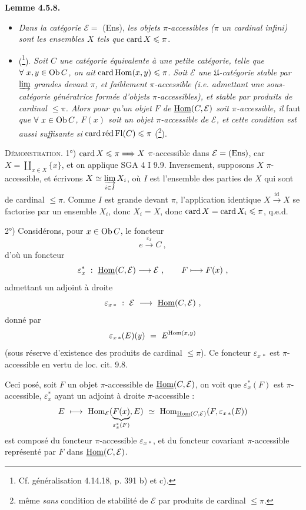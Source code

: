 \textbf{Lemme 4.5.8.}
\begin{itemize}[leftmargin=3em]
\item[\textit{1°)}] \textit{Dans la catégorie $\mathcal{E} = $} (Ens), \textit{les objets $\pi$-accessibles ($\pi$ un cardinal infini) sont les ensembles $X$ tels que} $\operatorname{card} X \leqslant \pi$.
\item[\textit{2°)}] (\footnote{Cf. généralisation 4.14.18, p. 391 b) et c).}). \textit{Soit $C$ une catégorie équivalente à une petite catégorie, telle que $\forall \ x, y \in \mathrm{Ob}\, C$, on ait} $\operatorname{card} \mathrm{Hom}(x,y) \leqslant \pi$. \textit{Soit $\mathcal{E}$ une $\mathfrak{U}$-catégorie stable par $\varinjlim$ grandes devant $\pi$, et faiblement $\pi$-accessible (i.e. admettant une sous-catégorie génératrice formée d'objets $\pi$-accessibles), et stable par produits de cardinal $\leqslant \pi$. Alors pour qu'un objet $F$ de $\underline{\mathrm{Hom}}(C,\mathcal{E})$ soit $\pi$-accessible, il} faut \textit{que $\forall \ x \in \mathrm{Ob}\, C$, $F(x)$ soit un objet $\pi$-accessible de $\mathcal{E}$, et cette condition est aussi suffisante si} $\operatorname{card} \operatorname{\text{réd}} \operatorname{Fl}(C) \leqslant \pi$ (\footnote{même \textit{sans} condition de stabilité de $\mathcal{E}$ par produits de cardinal $\leqslant \pi$.}).
\end{itemize}

\textsc{Démonstration.} 1°) $\operatorname{card} X \leqslant \pi \Longrightarrow X$ $\pi$-accessible dans $\mathcal{E} = (\mathrm{Ens})$, car $X = \coprod_{x \in X} \{x\}$, et on applique SGA 4 I 9.9. Inversement, supposons $X$ $\pi$-accessible, et écrivons $X \simeq \varinjlim\limits_{i \in I} X_i$, où $I$ est l'ensemble des parties de $X$ qui sont de cardinal $\leqslant \pi$. Comme $I$ est grande devant $\pi$, l'application identique $X \xrightarrow{\ \mathrm{id}\ } X$ se factorise par un ensemble $X_i$, donc $X_i = X$, donc $\operatorname{card} X = \operatorname{card} X_i \leqslant \pi$, q.e.d.


2°) Considérons, pour $x \in \mathrm{Ob}\, C$, le foncteur
\[
e \xrightarrow{\ \varepsilon_x\ } C \ ,
\]
d'où un foncteur
\[
\varepsilon_x^* \ : \ \uHom(C,\mathcal{E}) \longrightarrow \mathcal{E} \ , \qquad F \longmapsto F(x) \ ,
\]
admettant un adjoint à droite
\[
\varepsilon_{x\,*} \ : \ \mathcal{E} \ \longrightarrow \ \uHom(C,\mathcal{E}) \ ,
\]
donné par
\[
\varepsilon_{x\,*}(E)(y) \ = \ E^{\Hom(x,y)}
\]
(sous réserve d'existence des produits de cardinal $\leqslant \pi$). Ce foncteur $\varepsilon_{x\,*}$ est $\pi$-accessible en vertu de loc. cit. 9.8.

Ceci posé, soit $F$ un objet $\pi$-accessible de $\underline{\mathrm{Hom}}(C,\mathcal{E})$, on voit que $\varepsilon_x^*(F)$ est $\pi$-accessible, $\varepsilon_x^*$ ayant un adjoint à droite $\pi$-accessible :
\[
E \ \longmapsto \ \Hom_{\mathcal{E}}(\underbrace{F(x)}_{\varepsilon_x^*(F)}, E) \ \simeq \ \Hom_{\uHom(C,\mathcal{E})}(F, \varepsilon_{x\,*}(E))
\]
est composé du foncteur $\pi$-accessible $\varepsilon_{x\,*}$, et du foncteur covariant $\pi$-accessible représenté par $F$ dans $\underline{\mathrm{Hom}}(C,\mathcal{E})$.

